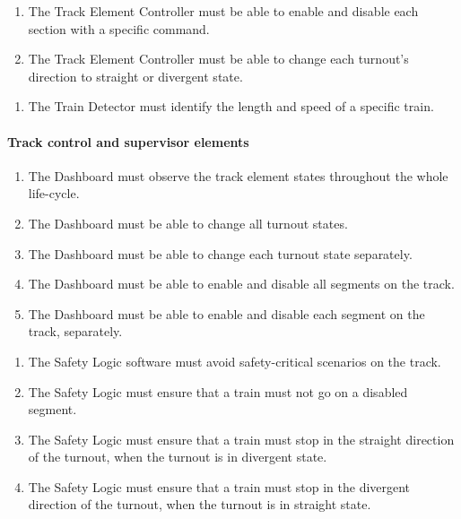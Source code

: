 \begin{enumerate}[label=REQ-TEC-\arabic*, leftmargin=*, format=\small]
	\item The Track Element Controller must be able to enable and disable each section with a specific command. \label{req:TEC-1}
	\item The Track Element Controller must be able to change each turnout's direction to straight or divergent state. \label{req:TEC-2}
\end{enumerate}

\begin{enumerate}[label=REQ-TD-\arabic*, leftmargin=*, format=\small]
	\item The Train Detector must identify the length and speed of a specific train. \label{req:TD}
\end{enumerate}

\paragraph{Track control and supervisor elements}

\begin{enumerate}[label=REQ-DB-\arabic*, leftmargin=*, format=\small]
	\item The Dashboard must observe the track element states throughout the whole life-cycle. \label{req:DB-1}
	\item The Dashboard must be able to change all turnout states. \label{req:DB-2}
	\item The Dashboard must be able to change each turnout state separately. \label{req:DB-3}
	\item The Dashboard must be able to enable and disable all segments on the track. \label{req:DB-4}
	\item The Dashboard must be able to enable and disable each segment on the track, separately. \label{req:DB-5}
\end{enumerate}


\begin{enumerate}[label=REQ-SL-\arabic*, leftmargin=*, format=\small]
	\item The Safety Logic software must avoid safety-critical scenarios on the track. \label{req:SL-1}
	\item The Safety Logic must ensure that a train must not go on a disabled segment. \label{req:SL-2}
	\item The Safety Logic must ensure that a train must stop in the straight direction of the turnout, when the turnout is in divergent state. \label{req:SL-3}
	\item The Safety Logic must ensure that a train must stop in the divergent direction of the turnout, when the turnout is in straight state. \label{req:SL-4}
\end{enumerate}
	

